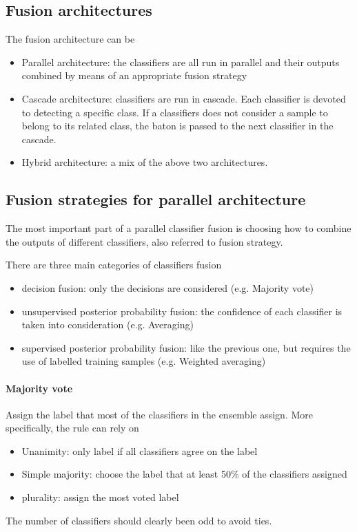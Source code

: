 \documentclass[oneside,onecolumn]{report}
\begin{document}
\subsection{Fusion architectures}
The fusion architecture can be
\begin{itemize}
    \item Parallel architecture: the classifiers are all run in parallel and their outputs combined by means of an appropriate fusion strategy

    \item Cascade architecture: classifiers are run in cascade.
    Each classifier is devoted to detecting a specific class.
    If a classifiers does not consider a sample to belong to its related class, the baton is passed to the next classifier in the cascade.

    \item Hybrid architecture: a mix of the above two architectures.
\end{itemize}


\subsection{Fusion strategies for parallel architecture}
The most important part of a parallel classifier fusion is choosing how to combine the outputs of different classifiers, also referred to fusion strategy.

There are three main categories of classifiers fusion
\begin{itemize}
    \item decision fusion: only the decisions are considered (e.g. Majority vote)
    \item unsupervised posterior probability fusion: the confidence of each classifier is taken into consideration (e.g. Averaging)
    \item supervised posterior probability fusion: like the previous one, but requires the use of labelled training samples (e.g. Weighted averaging)
\end{itemize}

\paragraph{Majority vote}
Assign the label that most of the classifiers in the ensemble assign.
More specifically, the rule can rely on
\begin{itemize}
    \item Unanimity: only label if all classifiers agree on the label
    \item Simple majority: choose the label that at least 50\% of the classifiers assigned
    \item plurality: assign the most voted label
\end{itemize}
The number of classifiers should clearly been odd to avoid ties.
\end{document}
